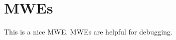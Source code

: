 \documentclass{article}
\begin{document}
\section{\Aclp*{MWE}}

This is a nice \ac{MWE}.
\Acp{MWE} are helpful for debugging.

\pagebreak
\printacronyms[name={My Acronyms}]
\end{document}
